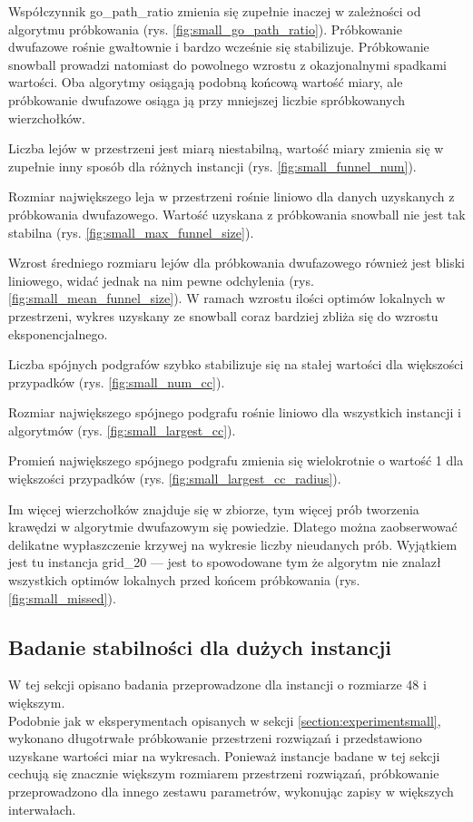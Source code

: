 Współczynnik go\_path\_ratio zmienia się zupełnie inaczej w zależności od algorytmu próbkowania (rys. \ref{fig:small_go_path_ratio}).
Próbkowanie dwufazowe rośnie gwałtownie i bardzo wcześnie się stabilizuje.
Próbkowanie snowball prowadzi natomiast do powolnego wzrostu z okazjonalnymi spadkami wartości.
Oba algorytmy osiągają podobną końcową wartość miary, ale próbkowanie dwufazowe osiąga ją przy mniejszej
liczbie spróbkowanych wierzchołków.

Liczba lejów w przestrzeni jest miarą niestabilną, wartość miary zmienia się w zupełnie inny sposób
dla różnych instancji (rys. \ref{fig:small_funnel_num}).

Rozmiar największego leja w przestrzeni rośnie liniowo dla danych uzyskanych z próbkowania
dwufazowego. Wartość uzyskana z próbkowania snowball nie jest tak stabilna (rys. \ref{fig:small_max_funnel_size}).

Wzrost średniego rozmiaru lejów dla próbkowania dwufazowego również jest bliski liniowego,
widać jednak na nim pewne odchylenia (rys. \ref{fig:small_mean_funnel_size}). W ramach wzrostu ilości optimów lokalnych w przestrzeni,
wykres uzyskany ze snowball coraz bardziej zbliża się do wzrostu eksponencjalnego.

Liczba spójnych podgrafów szybko stabilizuje się na stałej wartości dla większości przypadków (rys. \ref{fig:small_num_cc}).

Rozmiar największego spójnego podgrafu rośnie liniowo dla wszystkich instancji i algorytmów (rys. \ref{fig:small_largest_cc}).

Promień największego spójnego podgrafu zmienia się wielokrotnie o wartość 1 dla większości przypadków (rys. \ref{fig:small_largest_cc_radius}).

Im więcej wierzchołków znajduje się w zbiorze, tym więcej prób tworzenia krawędzi w algorytmie dwufazowym
się powiedzie. Dlatego można zaobserwować delikatne wypłaszczenie krzywej na wykresie liczby nieudanych prób.
Wyjątkiem jest tu instancja grid\_20  --- jest to spowodowane tym że algorytm nie znalazł wszystkich optimów
lokalnych przed końcem próbkowania (rys. \ref{fig:small_missed}).

\newpage

\subsection{Badanie stabilności dla dużych instancji} \label{section:experimentmain}
W tej sekcji opisano badania przeprowadzone dla instancji o rozmiarze 48 i większym. \\
Podobnie jak w eksperymentach opisanych w sekcji \ref{section:experimentsmall}, wykonano długotrwałe próbkowanie przestrzeni rozwiązań
i przedstawiono uzyskane wartości miar na wykresach.
Ponieważ instancje badane w tej sekcji cechują się znacznie większym rozmiarem przestrzeni rozwiązań, próbkowanie przeprowadzono
dla innego zestawu parametrów, wykonując zapisy w większych interwałach.

